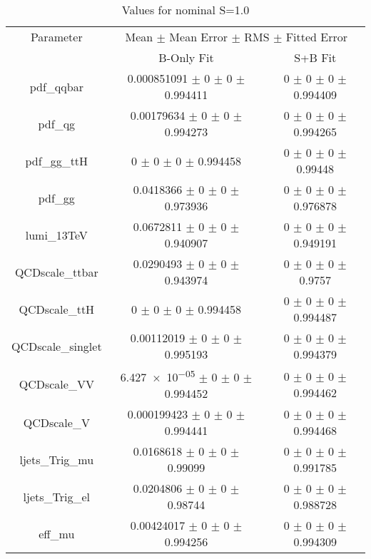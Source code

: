 \begin{table}
\centering
\caption{Values for nominal S=1.0}
\begin{tabular}{ccc}
\toprule
Parameter 	& \multicolumn{2}{c}{Mean $\pm$ Mean Error $\pm$ RMS $\pm$ Fitted Error}\\
 	& B-Only Fit & S+B Fit\\
\midrule
pdf\_qqbar 	& \num{0.000851091} $\pm$ \num{0} $\pm$ \num{0} $\pm$ \num{0.994411} 	& \num{0} $\pm$ \num{0} $\pm$ \num{0} $\pm$ \num{0.994409}\\
pdf\_qg 	& \num{0.00179634} $\pm$ \num{0} $\pm$ \num{0} $\pm$ \num{0.994273} 	& \num{0} $\pm$ \num{0} $\pm$ \num{0} $\pm$ \num{0.994265}\\
pdf\_gg\_ttH 	& \num{0} $\pm$ \num{0} $\pm$ \num{0} $\pm$ \num{0.994458} 	& \num{0} $\pm$ \num{0} $\pm$ \num{0} $\pm$ \num{0.99448}\\
pdf\_gg 	& \num{0.0418366} $\pm$ \num{0} $\pm$ \num{0} $\pm$ \num{0.973936} 	& \num{0} $\pm$ \num{0} $\pm$ \num{0} $\pm$ \num{0.976878}\\
lumi\_13TeV 	& \num{0.0672811} $\pm$ \num{0} $\pm$ \num{0} $\pm$ \num{0.940907} 	& \num{0} $\pm$ \num{0} $\pm$ \num{0} $\pm$ \num{0.949191}\\
QCDscale\_ttbar 	& \num{0.0290493} $\pm$ \num{0} $\pm$ \num{0} $\pm$ \num{0.943974} 	& \num{0} $\pm$ \num{0} $\pm$ \num{0} $\pm$ \num{0.9757}\\
QCDscale\_ttH 	& \num{0} $\pm$ \num{0} $\pm$ \num{0} $\pm$ \num{0.994458} 	& \num{0} $\pm$ \num{0} $\pm$ \num{0} $\pm$ \num{0.994487}\\
QCDscale\_singlet 	& \num{0.00112019} $\pm$ \num{0} $\pm$ \num{0} $\pm$ \num{0.995193} 	& \num{0} $\pm$ \num{0} $\pm$ \num{0} $\pm$ \num{0.994379}\\
QCDscale\_VV 	& \num{6.427e-05} $\pm$ \num{0} $\pm$ \num{0} $\pm$ \num{0.994452} 	& \num{0} $\pm$ \num{0} $\pm$ \num{0} $\pm$ \num{0.994462}\\
QCDscale\_V 	& \num{0.000199423} $\pm$ \num{0} $\pm$ \num{0} $\pm$ \num{0.994441} 	& \num{0} $\pm$ \num{0} $\pm$ \num{0} $\pm$ \num{0.994468}\\
ljets\_Trig\_mu 	& \num{0.0168618} $\pm$ \num{0} $\pm$ \num{0} $\pm$ \num{0.99099} 	& \num{0} $\pm$ \num{0} $\pm$ \num{0} $\pm$ \num{0.991785}\\
ljets\_Trig\_el 	& \num{0.0204806} $\pm$ \num{0} $\pm$ \num{0} $\pm$ \num{0.98744} 	& \num{0} $\pm$ \num{0} $\pm$ \num{0} $\pm$ \num{0.988728}\\
eff\_mu 	& \num{0.00424017} $\pm$ \num{0} $\pm$ \num{0} $\pm$ \num{0.994256} 	& \num{0} $\pm$ \num{0} $\pm$ \num{0} $\pm$ \num{0.994309}\\

\end{tabular}
\end{table}
